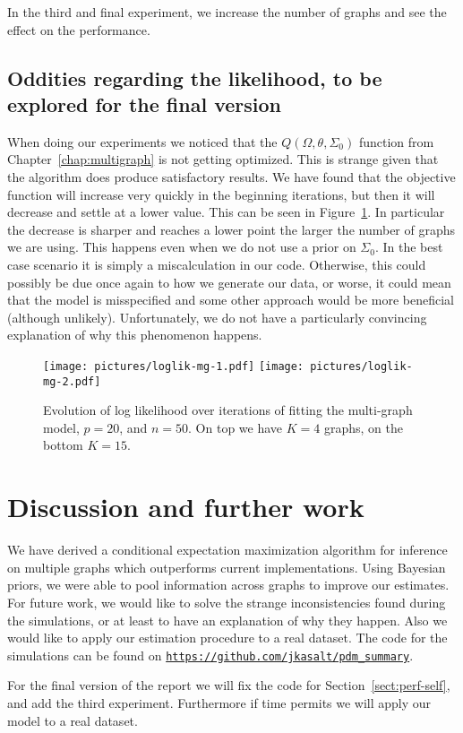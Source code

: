 \documentclass[a4paper, 11pt, oneside]{report}
\newcommand{\1}{\mathds{1}}
\begin{document}
In the third and final experiment, we increase the number of graphs and see the effect on the performance.
\section{Oddities regarding the likelihood, to be explored for the final version}
When doing our experiments we noticed that the $Q(\Omega, \theta, \Sigma_0)$ function from Chapter~\ref{chap:multigraph}
is not getting optimized. This is strange given that the algorithm does produce satisfactory results.
We have found that the objective function will increase very quickly in the beginning iterations,
but then it will decrease and settle at a lower value. This can be seen in Figure~\ref{fig:loglik-mg-1}.
In particular the decrease is sharper and reaches a lower point the larger the number of graphs we are using.
This happens even when we do not use a prior on $\Sigma_0$.
In the best case scenario it is simply a miscalculation in our code.
Otherwise, this could possibly be due once again to how we generate our data, or worse,
it could mean that the model is misspecified and some other approach would be more beneficial (although unlikely).
Unfortunately, we do not have a particularly convincing explanation of why this phenomenon happens.

\begin{figure}[ht]
	\begin{center}
		\texttt{[image: pictures/loglik-mg-1.pdf]}
		\texttt{[image: pictures/loglik-mg-2.pdf]}
		\hfill
	\end{center}
	\caption{Evolution of log likelihood over iterations of fitting the multi-graph model, $p=20$, and $n=50$. On top we have $K=4$ graphs, on the bottom $K=15$.}
	\label{fig:loglik-mg-1}
\end{figure}


\chapter{Discussion and further work}
We have derived a conditional expectation maximization algorithm for inference on multiple graphs
which outperforms current implementations. Using Bayesian priors, we were able to pool information across
graphs to improve our estimates.
For future work, we would like to solve the strange inconsistencies found during the simulations, or at
least to have an explanation of why they happen.
Also we would like to apply our estimation procedure to a real dataset.
The code for the simulations can be found on
\href{https://github.com/jkasalt/pdm_summary}{\texttt{https://github.com/jkasalt/pdm\_summary}}.

For the final version of the report we will fix the code for Section~\ref{sect:perf-self}, and add the third experiment. Furthermore if time permits we will apply our model to a real dataset.

\cleardoublepage
{}
{}
\printbibliography
\end{document}
